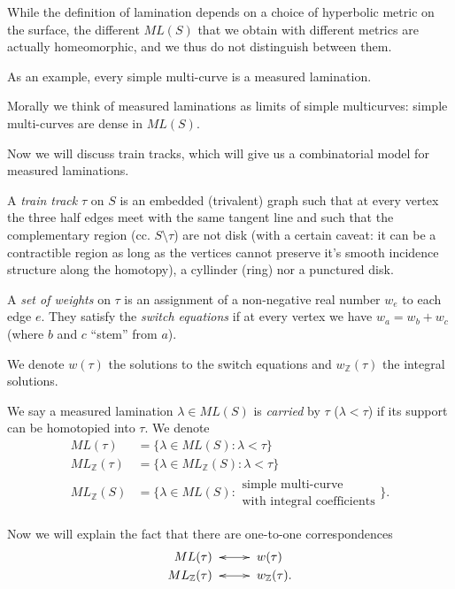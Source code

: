 \noindent
While the definition of lamination depends on
a choice
of hyperbolic metric on the surface, the
different $ML(S)$
that we obtain with different metrics are
actually homeomorphic,
and we thus do not distinguish between them.

As an example, every simple multi-curve is a
measured lamination.

Morally we think of measured laminations as
limits of simple multicurves:
simple multi-curves are dense in $ML(S)$.

\medskip\noindent
Now we will discuss train tracks, which will
give us a combinatorial model for measured
laminations.

\begin{definition}
\label{definition-train-track}
A {\it train track} $\tau$ on $S$ is an
embedded (trivalent)
graph such that at every vertex the three
half edges
meet with the same tangent line and such that
the complementary region (cc. $S \setminus
\tau$)
are not disk
(with a certain caveat: it can be a
contractible
region as long as the vertices cannot
preserve
it's smooth incidence structure
along the homotopy),
a cyllinder (ring) nor a punctured disk.

A {\it set of weights} on $\tau$ is an
assignment
of a non-negative real number $w_e$
to each edge $e$. They satisfy the {\it
switch equations}
if at every vertex we have $w_a=w_b+w_c$
(where $b$ and $c$ ``stem'' from $a$).

We denote $w(\tau)$ the solutions to the
switch equations
and $w_{\mathbb{Z}}(\tau)$ the integral
solutions.

We say a measured lamination $\lambda \in
ML(S)$
is {\it carried} by $\tau$ ($\lambda < \tau$)
if its support can be homotopied into $\tau$.
We denote
$$
\begin{aligned}
ML(\tau)&=\{\lambda \in ML(S):\lambda <
\tau\}\\
ML_{\mathbb{Z}}(\tau)&=\{\lambda \in
ML_{\mathbb{Z}}(S):\lambda <\tau\}\\
ML_{\mathbb{Z}}(S)&=\{\lambda \in
ML(S):\substack{\text{
simple multi-curve} \\ \text{with integral
coefficients}}\}.
\end{aligned}
$$
\end{definition}

\medskip\noindent
Now we will explain the fact that there are
one-to-one correspondences
$$
\begin{aligned}
ML(\tau)&\xymatrix{\ar@{<->}[r]&}w(\tau)\\
ML_{\mathbb{Z}}(\tau)&\xymatrix{\ar@{<->}[r]&
}w_{\mathbb{Z}}(\tau).
\end{aligned}
$$

